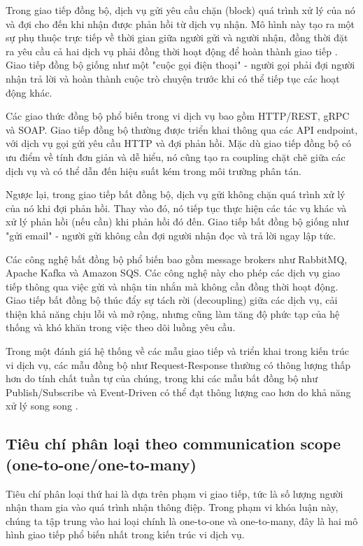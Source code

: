 Trong giao tiếp đồng bộ, dịch vụ gửi yêu cầu chặn (block) quá trình xử lý của nó và đợi cho đến khi nhận được phản hồi từ dịch vụ nhận. Mô hình này tạo ra một sự phụ thuộc trực tiếp về thời gian giữa người gửi và người nhận, đồng thời đặt ra yêu cầu cả hai dịch vụ phải đồng thời hoạt động để hoàn thành giao tiếp \cite{newman2015}. Giao tiếp đồng bộ giống như một "cuộc gọi điện thoại" - người gọi phải đợi người nhận trả lời và hoàn thành cuộc trò chuyện trước khi có thể tiếp tục các hoạt động khác.

Các giao thức đồng bộ phổ biến trong vi dịch vụ bao gồm HTTP/REST, gRPC và SOAP. Giao tiếp đồng bộ thường được triển khai thông qua các API endpoint, với dịch vụ gọi gửi yêu cầu HTTP và đợi phản hồi. Mặc dù giao tiếp đồng bộ có ưu điểm về tính đơn giản và dễ hiểu, nó cũng tạo ra coupling chặt chẽ giữa các dịch vụ và có thể dẫn đến hiệu suất kém trong môi trường phân tán.

Ngược lại, trong giao tiếp bất đồng bộ, dịch vụ gửi không chặn quá trình xử lý của nó khi đợi phản hồi. Thay vào đó, nó tiếp tục thực hiện các tác vụ khác và xử lý phản hồi (nếu cần) khi phản hồi đó đến. Giao tiếp bất đồng bộ giống như "gửi email" - người gửi không cần đợi người nhận đọc và trả lời ngay lập tức.

Các công nghệ bất đồng bộ phổ biến bao gồm message brokers như RabbitMQ, Apache Kafka và Amazon SQS. Các công nghệ này cho phép các dịch vụ giao tiếp thông qua việc gửi và nhận tin nhắn mà không cần đồng thời hoạt động. Giao tiếp bất đồng bộ thúc đẩy sự tách rời (decoupling) giữa các dịch vụ, cải thiện khả năng chịu lỗi và mở rộng, nhưng cũng làm tăng độ phức tạp của hệ thống và khó khăn trong việc theo dõi luồng yêu cầu.

Trong một đánh giá hệ thống về các mẫu giao tiếp và triển khai trong kiến trúc vi dịch vụ, các mẫu đồng bộ như Request-Response thường có thông lượng thấp hơn do tính chất tuần tự của chúng, trong khi các mẫu bất đồng bộ như Publish/Subscribe và Event-Driven có thể đạt thông lượng cao hơn do khả năng xử lý song song \cite{aksakalli2021}.

\subsection{Tiêu chí phân loại theo communication scope (one-to-one/one-to-many)}
Tiêu chí phân loại thứ hai là dựa trên phạm vi giao tiếp, tức là số lượng người nhận tham gia vào quá trình nhận thông điệp. Trong phạm vi khóa luận này, chúng ta tập trung vào hai loại chính là one-to-one và one-to-many, đây là hai mô hình giao tiếp phổ biến nhất trong kiến trúc vi dịch vụ.

